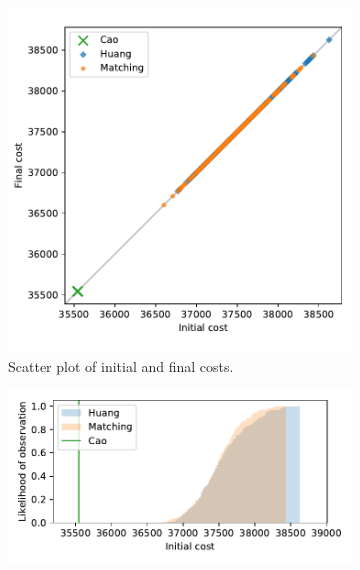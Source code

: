 \documentclass[smallextended]{svjour3}
\begin{document}
\begin{figure}
    \begin{subfigure}{.5\textwidth}
        \includegraphics[width=\linewidth]{Fig3a.pdf}
        \caption{Scatter plot of initial and final costs.}
    \end{subfigure}
    \hfill%
    \begin{subfigure}{.5\textwidth}
        \includegraphics[width=\linewidth]{Fig3b1.pdf}


\end{subfigure}
\end{figure}
\end{document}
